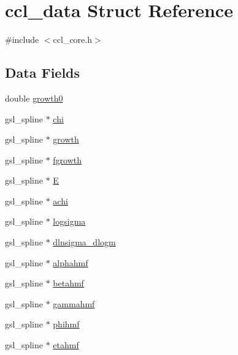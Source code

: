 \hypertarget{structccl__data}{}\section{ccl\+\_\+data Struct Reference}
\label{structccl__data}


{\ttfamily \#include $<$ccl\+\_\+core.\+h$>$}

\subsection*{Data Fields}
\begin{DoxyCompactItemize}
\item 
double \mbox{\hyperlink{structccl__data_a358d6ef796c6498a702840d987c888c8}{growth0}}
\item 
gsl\+\_\+spline $\ast$ \mbox{\hyperlink{structccl__data_a0101139b28262b96a1cd8e0f2bf67509}{chi}}
\item 
gsl\+\_\+spline $\ast$ \mbox{\hyperlink{structccl__data_a38f6caf298ee71f62260082c28323bec}{growth}}
\item 
gsl\+\_\+spline $\ast$ \mbox{\hyperlink{structccl__data_a4669cf3ca24eb93d4007a463f1a68db5}{fgrowth}}
\item 
gsl\+\_\+spline $\ast$ \mbox{\hyperlink{structccl__data_a6e2b679360c102f536705767dcce3f87}{E}}
\item 
gsl\+\_\+spline $\ast$ \mbox{\hyperlink{structccl__data_a0b1087588bd517142a5b6f8c352218e0}{achi}}
\item 
gsl\+\_\+spline $\ast$ \mbox{\hyperlink{structccl__data_a8b877a586de0aa78c7585338730b3139}{logsigma}}
\item 
gsl\+\_\+spline $\ast$ \mbox{\hyperlink{structccl__data_abbc06d5374095c69022c3ec9532ec146}{dlnsigma\+\_\+dlogm}}
\item 
gsl\+\_\+spline $\ast$ \mbox{\hyperlink{structccl__data_ad7fad40bf36fed46f5879104247de00b}{alphahmf}}
\item 
gsl\+\_\+spline $\ast$ \mbox{\hyperlink{structccl__data_a7ce4d3fb195d2dd11674bcc7e5f96afe}{betahmf}}
\item 
gsl\+\_\+spline $\ast$ \mbox{\hyperlink{structccl__data_a2d1c80d82e2d5373ca8c142d09853842}{gammahmf}}
\item 
gsl\+\_\+spline $\ast$ \mbox{\hyperlink{structccl__data_a6417dfa54222033c8c229d3ca5e0866e}{phihmf}}
\item 
gsl\+\_\+spline $\ast$ \mbox{\hyperlink{structccl__data_a1dea641d6ae09c5e2ee8811a21c6ceda}{etahmf}}
\item 

\end{DoxyCompactItemize}
